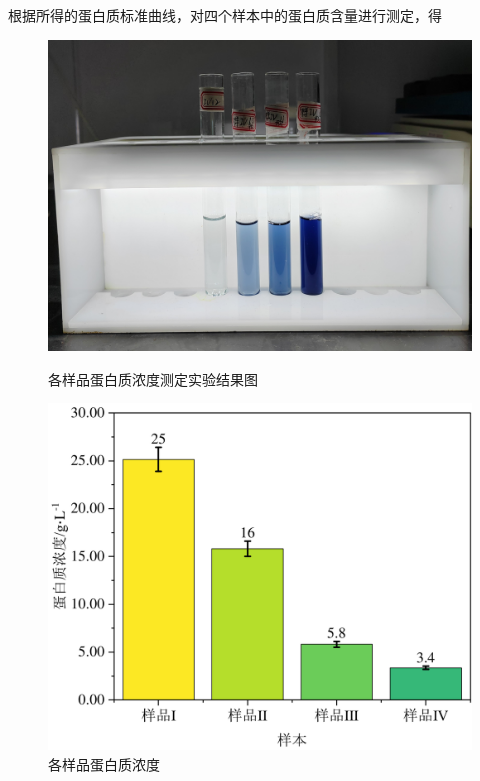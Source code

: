 根据所得的蛋白质标准曲线，对四个样本中的蛋白质含量进行测定，得

\begin{figure}[H]
    \begin{minipage}[t]{0.49\textwidth}
        \includegraphics[width = \textwidth]{figure/1124/Pro_Samples.jpg}
        \caption{各样品蛋白质浓度测定实验结果图}
        \label{fig:Pro_Samples_result}
    \end{minipage}
    \begin{minipage}[t]{0.48\textwidth}
        \includegraphics[width = \textwidth]{figure/1124/Protein_Samples.pdf}
        \caption{各样品蛋白质浓度}
        \label{fig:Pro_Samples}
    \end{minipage}
\end{figure}

